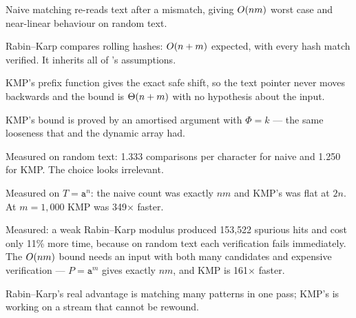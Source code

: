 \begin{chaptersummary}
\begin{tight}
  \item Naive matching re-reads text after a mismatch, giving $O(nm)$ worst
        case and near-linear behaviour on random text.
  \item Rabin--Karp compares rolling hashes: $O(n+m)$ expected, with every
        hash match verified. It inherits all of 's assumptions.
  \item KMP's prefix function gives the exact safe shift, so the text pointer
        never moves backwards and the bound is $\Theta(n+m)$ with no
        hypothesis about the input.
  \item KMP's bound is proved by an amortised argument with $\Phi = k$ --- the
        same looseness that  and the dynamic array had.
  \item Measured on random text: 1.333 comparisons per character for naive and
        1.250 for KMP. The choice looks irrelevant.
  \item Measured on $T = \texttt{a}^{n}$: the naive count was exactly $nm$ and
        KMP's was flat at $2n$. At $m = 1{,}000$ KMP was 349$\times$ faster.
  \item Measured: a weak Rabin--Karp modulus produced 153{,}522 spurious hits
        and cost only 11\% more time, because on random text each verification
        fails immediately. The $O(nm)$ bound needs an input with both many
        candidates and expensive verification --- $P = \texttt{a}^{m}$ gives
        exactly $nm$, and KMP is 161$\times$ faster.
  \item Rabin--Karp's real advantage is matching many patterns in one pass;
        KMP's is working on a stream that cannot be rewound.
\end{tight}
\end{chaptersummary}


